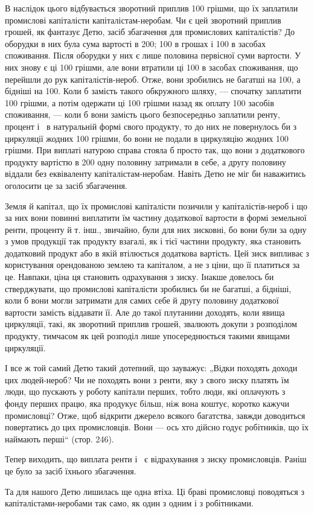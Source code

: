 
\roztyagnut{}
В наслідок цього відбувається зворотний приплив 100 грішми, що їх заплатили промислові
капіталісти капіталістам-неробам. Чи є цей зворотний приплив грошей, як фантазує Детю, засіб
збагачення для промислових капіталістів? До оборудки в них була сума вартості в 200; 100 в грошах і 100 в засобах споживання. Після оборудки у них є лише половина
первісної суми вартости. У них знову є ці 100 грішми, але вони втратили ці 100 в
засобах споживання, що перейшли до рук капіталістів-нероб. Отже, вони зробились не багатші на 100, а бідніші на 100. Коли б замість такого обкружного шляху, — спочатку заплатити 100 грішми, а потім одержати ці 100 грішми назад як оплату 100 засобів
споживання, — коли б вони замість цього безпосередньо заплатили ренту, процент і~ в
натуральній формі свого продукту, то до них не повернулось би з циркуляції жодних 100
грішми, бо вони не подали в циркуляцію жодних 100 грішми. При виплаті натурою справа
стояла б просто так, що вони з додаткового продукту вартістю в 200 одну половину затримали
в себе, а другу половину віддали без еквіваленту капіталістам-неробам. Навіть Детю не міг би
наважитись оголосити це за засіб збагачення.

Земля й капітал, що їх промислові капіталісти позичили у капіталістів-нероб і що за них вони повинні
виплатити їм частину додаткової вартости в формі земельної ренти, проценту й т. інш., звичайно, були
для них зисковні, бо вони були за одну з умов продукції так продукту взагалі, як і тієї частини
продукту, яка становить додатковий продукт або в якій втілюється додаткова вартість. Цей зиск
випливає з користування орендованою землею та капіталом, а не з ціни, що її платиться за це.
Навпаки, ціна ця становить одрахування з зиску. Інакше довелось би стверджувати, що промислові
капіталісти зробились би не багатші, а бідніші, коли б вони могли затримати для самих себе й другу
половину додаткової вартости замість віддавати її. Але до такої плутанини доходять, коли явища
циркуляції, такі, як зворотний приплив грошей, звалюють докупи з розподілом продукту, тимчасом як
цей розподіл лише упосереднюється такими явищами циркуляції.

І все ж той самий Детю такий дотепний, що зауважує: „Відки походять доходи цих людей-нероб? Чи не
походять вони з ренти, яку з свого зиску платять їм люди, що пускають у роботу капітали перших,
тобто люди, які оплачують з фонду перших працю, яка продукує більш, ніж вона коштує, коротко кажучи
промисловці? Отже, щоб відкрити джерело всякого багатства, завжди доводиться повертатись до цих
промисловців. Вони — ось хто дійсно годує робітників, що їх наймають перші“ (стор. 246).

Тепер виходить, що виплата ренти і~ є відрахування з зиску промисловців. Раніш це було за
засіб їхнього збагачення.

Та для нашого Детю лишилась ще одна втіха. Ці браві промисловці поводяться з капіталістами-неробами
так само, як один з одним і з робітниками.
\parbreak{}  %
